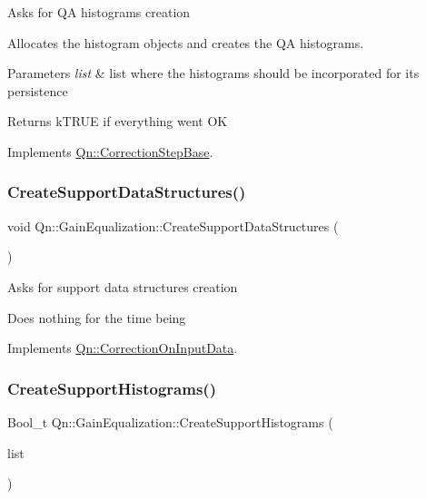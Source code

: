 Asks for QA histograms creation

Allocates the histogram objects and creates the QA histograms. 
\begin{DoxyParams}{Parameters}
{\em list} & list where the histograms should be incorporated for its persistence \\
\hline
\end{DoxyParams}
\begin{DoxyReturn}{Returns}
k\+T\+R\+UE if everything went OK 
\end{DoxyReturn}


Implements \mbox{\hyperlink{classQn_1_1CorrectionStepBase_a21f58f5d91209c1c74d0928cf0b3e26d}{Qn\+::\+Correction\+Step\+Base}}.

\mbox{\label{classQn_1_1GainEqualization_a3b1da6e8711ef1e7dea394d3612ee8f9}} 
\subsubsection{\texorpdfstring{Create\+Support\+Data\+Structures()}{CreateSupportDataStructures()}}
{\footnotesize\ttfamily void Qn\+::\+Gain\+Equalization\+::\+Create\+Support\+Data\+Structures (\begin{DoxyParamCaption}{ }\end{DoxyParamCaption})\hspace{0.3cm}{\ttfamily [virtual]}}

Asks for support data structures creation

Does nothing for the time being 

Implements \mbox{\hyperlink{classQn_1_1CorrectionOnInputData_a7da5cb5e6c82e28e2dd63d82ac82bc8a}{Qn\+::\+Correction\+On\+Input\+Data}}.

\mbox{\label{classQn_1_1GainEqualization_a3f34cc42fe078c556d9acf98525490ce}} 
\subsubsection{\texorpdfstring{Create\+Support\+Histograms()}{CreateSupportHistograms()}}
{\footnotesize\ttfamily Bool\+\_\+t Qn\+::\+Gain\+Equalization\+::\+Create\+Support\+Histograms (\begin{DoxyParamCaption}\item[{T\+List $\ast$}]{list }\end{DoxyParamCaption})\hspace{0.3cm}{\ttfamily [virtual]}}

